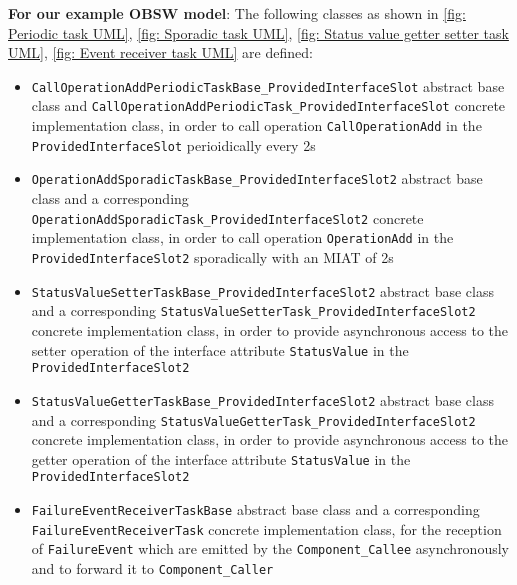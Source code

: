 \textbf{For our example OBSW model}: The following classes as shown in \cref{fig: Periodic task UML}, \cref{fig: Sporadic task UML}, \cref{fig: Status value getter setter task UML}, \cref{fig: Event receiver task UML} are defined:
\begin{itemize}
\item \texttt{CallOperationAdd\allowbreak Periodic\allowbreak TaskBase\_\allowbreak Provided\allowbreak Interface\allowbreak Slot} abstract base class and \texttt{Call\allowbreak OperationAdd\allowbreak Periodic\allowbreak Task\_\allowbreak Provided\allowbreak Interface\allowbreak Slot} concrete implementation class, in order to call operation \texttt{Call\allowbreak OperationAdd} in the \texttt{Provided\allowbreak Interface\allowbreak Slot} perioidically every 2s
\item \texttt{OperationAdd\allowbreak Sporadic\allowbreak TaskBase\allowbreak \_\allowbreak Provided\allowbreak Interface\allowbreak Slot2} abstract base class and a corresponding \texttt{Operation\allowbreak Add\allowbreak Sporadic\allowbreak Task\_\allowbreak Provided\allowbreak Interface\allowbreak Slot2} concrete implementation class, in order to call operation \texttt{Operation\allowbreak Add} in the \texttt{Provided\allowbreak Interface\allowbreak Slot2} sporadically with an MIAT of 2s
\item \texttt{StatusValue\allowbreak SetterTaskBase\allowbreak \_\allowbreak Provided\allowbreak Interface\allowbreak Slot2} abstract base class and a corresponding \texttt{Status\allowbreak Value\allowbreak Setter\allowbreak Task\allowbreak \_\allowbreak Provided\allowbreak Interface\allowbreak Slot2} concrete implementation class, in order to provide asynchronous access to the setter operation of the interface attribute \texttt{Status\allowbreak Value} in the \texttt{Provided\allowbreak Interface\allowbreak Slot2}
\item \texttt{StatusValue\allowbreak GetterTaskBase\allowbreak \_\allowbreak Provided\allowbreak Interface\allowbreak Slot2} abstract base class and a corresponding \texttt{Status\allowbreak Value\allowbreak Getter\allowbreak Task\allowbreak \_\allowbreak Provided\allowbreak Interface\allowbreak Slot2} concrete implementation class, in order to provide asynchronous access to the getter operation of the interface attribute \texttt{Status\allowbreak Value} in the \texttt{Provided\allowbreak Interface\allowbreak Slot2}
\item \texttt{Failure\allowbreak Event\allowbreak Receiver\allowbreak Task\allowbreak Base} abstract base class and a corresponding \texttt{Failure\allowbreak Event\allowbreak Receiver\allowbreak Task} concrete implementation class, for the reception of \texttt{Failure\allowbreak Event} which are emitted by the \texttt{Component\allowbreak\_Callee} asynchronously and to forward it to \texttt{Component\allowbreak\_Caller} 
\end{itemize} 

